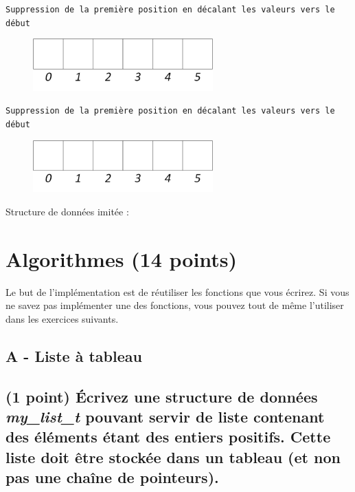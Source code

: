 \documentclass[11pt,a4paper]{article}
\begin{document}
\begin{center}
\texttt{Suppression de la première position en décalant les valeurs vers le début}

\begin{figure}[ht!]
\centering
\centerline{  %
\includegraphics[height=2cm]{img/Liste_t_vide.png}
}
\end{figure}


\texttt{Suppression de la première position en décalant les valeurs vers le début}

\begin{figure}[ht!]
\centering
\centerline{  %
\includegraphics[height=2cm]{img/Liste_t_vide.png}
}
\end{figure}


\end{center}

Structure de données imitée :

\bigskip



\newpage

%
\section{Algorithmes (14 points)}

Le but de l'implémentation est de réutiliser les fonctions que vous écrirez.
Si vous ne savez pas implémenter une des fonctions, vous pouvez tout de même l'utiliser dans les exercices suivants.

\vfillFirst

\subsection*{A - Liste à tableau}

\subsection{(1 point) \'Ecrivez une structure de données \og \textit{my\_list\_t} \fg{} pouvant servir de liste contenant des éléments étant des entiers positifs. Cette liste doit être stockée dans un tableau (et non pas une chaîne de pointeurs). }
\end{document}
